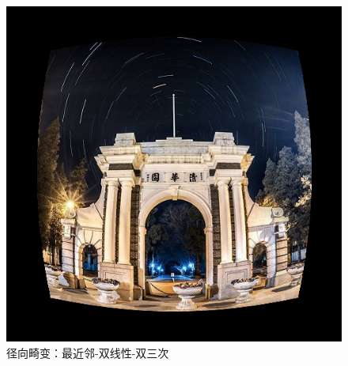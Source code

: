 \documentclass[UTF8]{ctexart}
\begin{document}
\begin{figure}[H]
    \includegraphics[scale=0.2]{../images/report-images/radical_distortionbicub.png}
    \caption{径向畸变：最近邻-双线性-双三次}
\end{figure}
\end{document}
